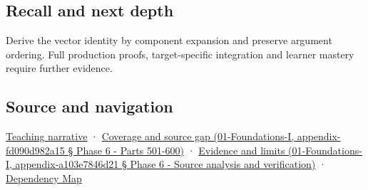 \subsection{Recall and next depth}\label{recall-and-next-depth}

Derive the vector identity by component expansion and preserve argument ordering. Full production proofs, target-specific integration and learner mastery require further evidence.

\subsection{Source and navigation}\label{source-and-navigation}

\href{Continuous\%20Notes/Computing\%20Foundations\%20-\%20From\%20Bits\%20to\%20C++\%20and\%20Systems\%20APIs\#Signed\%20volume\%20extends\%20the\%20same\%20idea\%20into\%20space}{Teaching narrative} · \href{}{Coverage and source gap (01-Foundations-I, appendix-fd090d982a15 § Phase 6 - Parts 501-600)} · \href{}{Evidence and limits (01-Foundations-I, appendix-a103e7846d21 § Phase 6 - Source analysis and verification)} · \hyperref[appendix-4ad47bdd269a]{Dependency Map}
